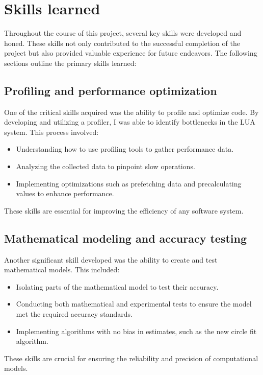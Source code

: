\section{Skills learned}
\label{sec:skills}

Throughout the course of this project, several key skills were developed and honed. These skills not only contributed to the successful completion of the project but also provided valuable experience for future endeavors. The following sections outline the primary skills learned:

\subsection{Profiling and performance optimization}
One of the critical skills acquired was the ability to profile and optimize code. By developing and utilizing a profiler, I was able to identify bottlenecks in the LUA system. This process involved:
\begin{itemize}
    \item Understanding how to use profiling tools to gather performance data.
    \item Analyzing the collected data to pinpoint slow operations.
    \item Implementing optimizations such as prefetching data and precalculating values to enhance performance.
\end{itemize}
These skills are essential for improving the efficiency of any software system.

\subsection{Mathematical modeling and accuracy testing}
Another significant skill developed was the ability to create and test mathematical models. This included:
\begin{itemize}
    \item Isolating parts of the mathematical model to test their accuracy.
    \item Conducting both mathematical and experimental tests to ensure the model met the required accuracy standards.
    \item Implementing algorithms with no bias in estimates, such as the new circle fit algorithm.
\end{itemize}
These skills are crucial for ensuring the reliability and precision of computational models.

